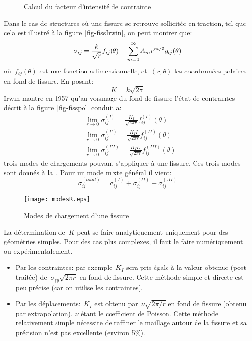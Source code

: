 \begin{figure}[ht]\centering
{}\hspace{6em}
\caption{Calcul du facteur d'intensité de contrainte}
\end{figure}
Dans le cas de structures où une fissure se retrouve sollicitée en traction, tel que cela est illustré à la figure~\ref{fig-fissIrwin},
on peut montrer que:
\begin{equation} \sigma_{ij} = \frac{k}{\sqrt{r}} f_{ij}(\theta) + \displaystyle\sum_{m=0}^\infty A_m r^{m/2} g_{ij}(\theta) \end{equation}
où~$f_{ij}(\theta)$ est une fonction adimensionnelle, et~$(r, \theta)$ les coordonnées polaires en fond
de fissure.
En posant:
\begin{equation} K = k\sqrt{2\pi} \end{equation}
Irwin montre en 1957 qu'au voisinage du fond de
fissure l'état de contraintes décrit à la figure~\ref{fig-fisspol} conduit a:
\begin{align}
&\lim_{r\rightarrow0} \sigma_{ij}^{(I)} = \frac{K_I}{\sqrt{2\pi r}} f_{ij}^{(I)}(\theta) \\
&\lim_{r\rightarrow0} \sigma_{ij}^{(II)} = \frac{K_II}{\sqrt{2\pi r}} f_{ij}^{(II)}(\theta) \\
&\lim_{r\rightarrow0} \sigma_{ij}^{(III)} = \frac{K_III}{\sqrt{2\pi r}} f_{ij}^{(III)}(\theta)
\end{align}
trois modes de chargements pouvant s'appliquer à une fissure. Ces trois modes sont donnés à la~.
Pour un mode mixte général il vient:
\begin{equation} \sigma_{ij}^{(total)} = \sigma_{ij}^{(I)} + \sigma_{ij}^{(II)} + \sigma_{ij}^{(III)} \end{equation}
\begin{figure}[htb]
\centering\texttt{[image: modesR.eps]}
\caption{Modes de chargement d'une fissure}\label{fig-modesR}
\end{figure}


\medskip{}
La détermination de~$K$ peut se faire analytiquement uniquement pour des géométries simples.
Pour des cas plus complexes, il faut le faire numériquement ou expérimentalement.
\begin{itemize}
\item Par les contraintes: par exemple~$K_I$ sera pris égale à la valeur obtenue (post-traitée)
de~$\sigma_{yy}\sqrt{2\pi r}$ en fond de fissure. Cette méthode simple et directe est peu
précise (car on utilise les contraintes).
\item Par les déplacements:~$K_I$ est obtenu par~$\nu \sqrt{2\pi/r}$ en fond de fissure (obtenu
par extrapolation), $\nu$ étant le coefficient de Poisson.
Cette méthode relativement simple nécessite de raffiner le maillage
autour de la fissure et sa précision n'est pas excellente (environ 5\%).
\end{itemize}

